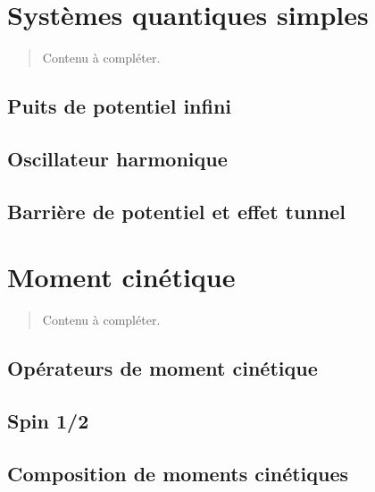 \documentclass[
  french,
  11pt,
  letterpaper,
]{book}
\begin{document}

\chapter{Systèmes quantiques
simples}\label{systuxe8mes-quantiques-simples}

\begin{quote}
Contenu à compléter.
\end{quote}

\section{Puits de potentiel infini}\label{puits-de-potentiel-infini}

\section{Oscillateur harmonique}\label{oscillateur-harmonique}

\section{Barrière de potentiel et effet
tunnel}\label{barriuxe8re-de-potentiel-et-effet-tunnel}


\chapter{Moment cinétique}\label{moment-cinuxe9tique}

\begin{quote}
Contenu à compléter.
\end{quote}

\section{Opérateurs de moment
cinétique}\label{opuxe9rateurs-de-moment-cinuxe9tique}

\section{Spin 1/2}\label{spin-12}

\section{Composition de moments
cinétiques}\label{composition-de-moments-cinuxe9tiques}
\end{document}
